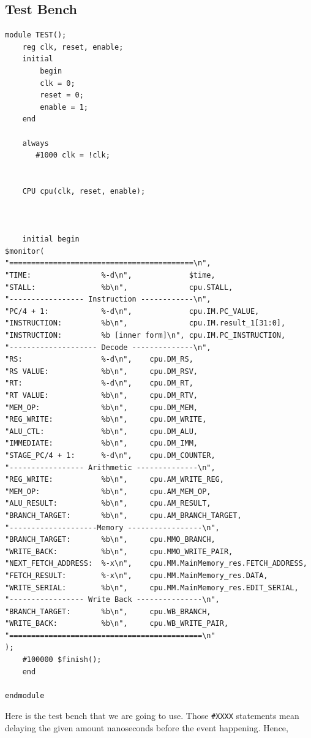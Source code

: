 \documentclass[a4paper,12pt, oneside]{book}
\begin{document}
\subsection{Test Bench}
\begin{verbatim}
module TEST();
    reg clk, reset, enable;
    initial 
        begin
        clk = 0;
        reset = 0;
        enable = 1;
    end

    always
       #1000 clk = !clk;


    CPU cpu(clk, reset, enable);



    initial begin
$monitor(
"==========================================\n",
"TIME:                %-d\n",             $time, 
"STALL:               %b\n",              cpu.STALL,
"----------------- Instruction ------------\n",
"PC/4 + 1:            %-d\n",             cpu.IM.PC_VALUE,
"INSTRUCTION:         %b\n",              cpu.IM.result_1[31:0],
"INSTRUCTION:         %b [inner form]\n", cpu.IM.PC_INSTRUCTION,
"-------------------- Decode --------------\n",
"RS:                  %-d\n",    cpu.DM_RS,
"RS VALUE:            %b\n",     cpu.DM_RSV,
"RT:                  %-d\n",    cpu.DM_RT,
"RT VALUE:            %b\n",     cpu.DM_RTV,
"MEM_OP:              %b\n",     cpu.DM_MEM,
"REG_WRITE:           %b\n",     cpu.DM_WRITE,
"ALU_CTL:             %b\n",     cpu.DM_ALU,
"IMMEDIATE:           %b\n",     cpu.DM_IMM,
"STAGE_PC/4 + 1:      %-d\n",    cpu.DM_COUNTER,
"----------------- Arithmetic --------------\n",
"REG_WRITE:           %b\n",     cpu.AM_WRITE_REG,
"MEM_OP:              %b\n",     cpu.AM_MEM_OP,
"ALU_RESULT:          %b\n",     cpu.AM_RESULT,
"BRANCH_TARGET:       %b\n",     cpu.AM_BRANCH_TARGET,
"--------------------Memory -----------------\n",
"BRANCH_TARGET:       %b\n",     cpu.MMO_BRANCH,
"WRITE_BACK:          %b\n",     cpu.MMO_WRITE_PAIR,
"NEXT_FETCH_ADDRESS:  %-x\n",    cpu.MM.MainMemory_res.FETCH_ADDRESS,
"FETCH_RESULT:        %-x\n",    cpu.MM.MainMemory_res.DATA,
"WRITE_SERIAL:        %b\n",     cpu.MM.MainMemory_res.EDIT_SERIAL,
"----------------- Write Back ---------------\n",
"BRANCH_TARGET:       %b\n",     cpu.WB_BRANCH,
"WRITE_BACK:          %b\n",     cpu.WB_WRITE_PAIR,
"============================================\n"
);
    #100000 $finish();
    end

endmodule
\end{verbatim}
Here is the test bench that we are going to use. Those \texttt{#XXXX} statements mean delaying the given amount nanoseconds before the event happening. Hence,
\end{document}
